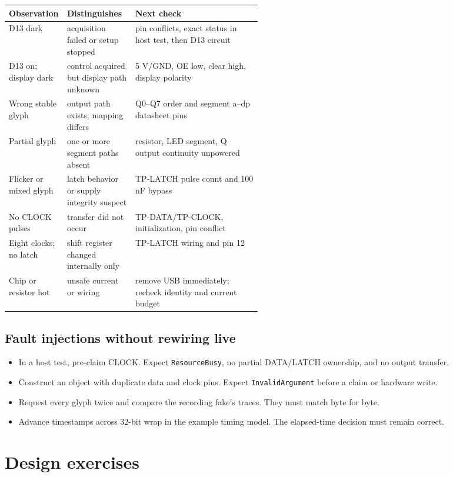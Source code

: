 \documentclass[11pt]{article}
\begin{document}
\begin{tabularx}{\linewidth}{@{}p{0.23\linewidth} p{0.27\linewidth} X@{}}
\toprule
Observation & Distinguishes & Next check\\
\midrule
D13 dark & acquisition failed or setup stopped & pin conflicts, exact status in host test, then D13 circuit\\
D13 on; display dark & control acquired but display path unknown & 5 V/GND, OE low, clear high, display polarity\\
Wrong stable glyph & output path exists; mapping differs & Q0--Q7 order and segment a--dp datasheet pins\\
Partial glyph & one or more segment paths absent & resistor, LED segment, Q output continuity unpowered\\
Flicker or mixed glyph & latch behavior or supply integrity suspect & TP-LATCH pulse count and 100 nF bypass\\
No CLOCK pulses & transfer did not occur & TP-DATA/TP-CLOCK, initialization, pin conflict\\
Eight clocks; no latch & shift register changed internally only & TP-LATCH wiring and pin 12\\
Chip or resistor hot & unsafe current or wiring & remove USB immediately; recheck identity and current budget\\
\bottomrule
\end{tabularx}

\subsection{Fault injections without rewiring live}

\begin{itemize}
  \item In a host test, pre-claim CLOCK. Expect \texttt{ResourceBusy}, no
        partial DATA/LATCH ownership, and no output transfer.
  \item Construct an object with duplicate data and clock pins. Expect
        \texttt{InvalidArgument} before a claim or hardware write.
  \item Request every glyph twice and compare the recording fake's traces.
        They must match byte for byte.
  \item Advance timestamps across 32-bit wrap in the example timing model.
        The elapsed-time decision must remain correct.
\end{itemize}

\section{Design exercises}
\end{document}
